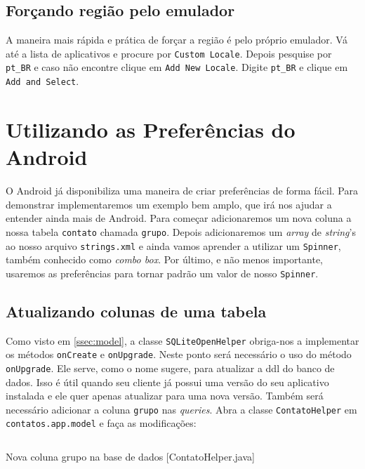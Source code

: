 \subsection{Forçando região pelo emulador}

A maneira mais rápida e prática de forçar a região é pelo próprio
emulador. Vá até a lista de aplicativos e procure por
\texttt{Custom Locale}. Depois pesquise por \texttt{pt\_BR} e caso não
encontre clique em \texttt{Add New Locale}. Digite \texttt{pt\_BR} e
clique em \texttt{Add and Select}.

\section{Utilizando as Preferências do Android}

O Android já disponibiliza uma maneira de criar preferências de forma
fácil. Para demonstrar implementaremos um exemplo bem amplo, que irá nos
ajudar a entender ainda mais de Android. Para começar adicionaremos um
nova coluna a nossa tabela \texttt{contato} chamada \texttt{grupo}.
Depois adicionaremos um \emph{array} de \emph{string}'s ao nosso arquivo
\texttt{strings.xml} e ainda vamos aprender a utilizar um
\texttt{Spinner}, também conhecido como \emph{combo box}. Por último, e
não menos importante, usaremos as preferências para tornar padrão um
valor de nosso \texttt{Spinner}.

\subsection{Atualizando colunas de uma tabela}

Como visto em \ref{ssec:model}, a classe \texttt{SQLiteOpenHelper}
obriga-nos a implementar os métodos \texttt{onCreate} e
\texttt{onUpgrade}. Neste ponto será necessário o uso do método
\texttt{onUpgrade}. Ele serve, como o nome sugere, para atualizar a
\gls{ddl} do banco de dados. Isso é útil quando seu cliente já possui
uma versão do seu aplicativo instalada e ele quer apenas atualizar para
uma nova versão. Também será necessário adicionar a coluna
\texttt{grupo} nas \emph{queries}. Abra a classe \texttt{ContatoHelper}
em \texttt{contatos.app.model} e faça as modificações:

\begin{listing}[H]
  \inputminted[linenos=true,frame=bottomline,tabsize=3]{ java }{ source/ContatoHelper-6.java }
  \caption{Nova coluna grupo na base de dados [ContatoHelper.java]}
\end{listing}

